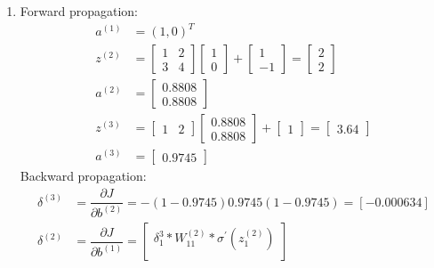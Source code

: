 \documentclass[12pt]{article}
\begin{document}
\section{}
\begin{enumerate}
	\item 
	Forward propagation:
	\begin{align*}
		a^{(1)} &= (1,0)^T\\
		z^{(2)} &= 
		\begin{bmatrix}
			1 & 2\\
			3 & 4
		\end{bmatrix}
		\begin{bmatrix}
			1 \\
			0
		\end{bmatrix}
	+ 
		\begin{bmatrix}
			1\\
			-1
		\end{bmatrix}
	= 
		\begin{bmatrix}
			2\\
			2
		\end{bmatrix}\\
	a^{(2)} &= 
		\begin{bmatrix}
			0.8808\\
			0.8808
		\end{bmatrix}\\
	z^{(3)} &= 
		\begin{bmatrix}
			1 & 2
		\end{bmatrix}
		\begin{bmatrix}
			0.8808\\
			0.8808
		\end{bmatrix}
	+ 
		\begin{bmatrix}
			1
		\end{bmatrix}
	=
		\begin{bmatrix}
			3.64
		\end{bmatrix}\\
	a^{(3)} &= 	
		\begin{bmatrix}
			0.9745
		\end{bmatrix}
	\end{align*}
	Backward propagation:
	\begin{align*}
		\delta^{(3)} &= \dfrac{\partial J}{\partial b^{(2)}} = -\left(1 - 0.9745\right)0.9745 \left(1-0.9745\right) = [-0.000634]\\
		\delta^{(2)} &= \dfrac{\partial J}{\partial b^{(1)}} =
			\begin{bmatrix}
				\delta_1^{3} * W_{11}^{(2)} * \sigma^\prime\left(z_1^{(2)}\right)\\

\end{bmatrix}
\end{align*}
\end{enumerate}
\end{document}
